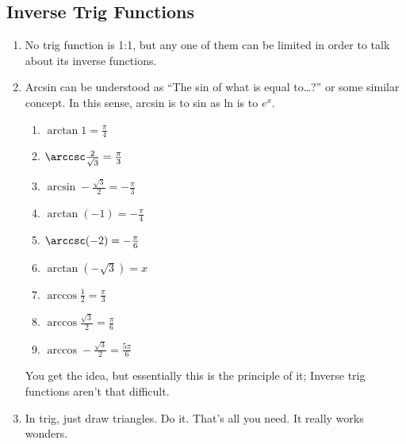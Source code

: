 \documentclass[11pt]{article}
\begin{document}
\subsection{Inverse Trig Functions}
\begin{enumerate}
	\item No trig function is 1:1, but any one of them can be limited in order 
		to talk about its inverse functions.
	\item Arcsin can be understood as ``The sin of what is equal to\dots?'' or 
		some similar concept.  In this sense, arcsin is to sin as ln is to $e^x$.  
		\begin{enumerate}
			\item $\arctan 1 = \frac{\pi}{4}$
			\item $\arccsc \frac{2}{\sqrt{3}} = \frac{\pi}{3}$
			\item $\arcsin -\frac{\sqrt{3}}{2} = -\frac{\pi}{3}$
			\item $\arctan (-1) = -\frac{\pi}{4}$
			\item $\arccsc (-2) = -\frac{\pi}{6}$
			\item $\arctan (-\sqrt{3}) = x$
			\item $\arccos \frac{1}{2} = \frac{\pi}{3}$
			\item $\arccos \frac{\sqrt {3}}{2} = \frac{\pi}{6}$
			\item $\arccos - \frac{\sqrt {3}}{2} = \frac{5\pi}{6}$
		\end{enumerate}
		You get the idea, but essentially this is the principle of it; Inverse 
		trig functions aren't that difficult.
	\item In trig, just draw triangles.  Do it.  That's all you need.  It 
		really works wonders.
\end{enumerate}
\end{document}
